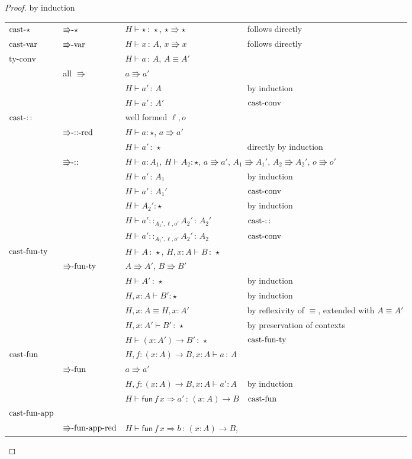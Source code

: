 \begin{proof}
by induction

\begin{tabular}{llll}
$\operatorname{cast-\star}$ & $\textrm{\ensuremath{\Rrightarrow}-}\star$ & $H\vdash\star\,:\,\star$, $\star\Rrightarrow\star$ & follows directly\tabularnewline
$\operatorname{cast-var}$ & $\textrm{\ensuremath{\Rrightarrow}-var}$ & $H\vdash x\,:\,A$, $x\Rrightarrow x$ & follows directly\tabularnewline
$\textrm{ty-conv}$ &  & $H\vdash a\,:\,A$, $A\equiv A'$ & \tabularnewline
 & all $\Rrightarrow$ & $a\Rrightarrow a'$ & \tabularnewline
 &  & $H\vdash a'\,:\,A$ & by induction\tabularnewline
 &  & $H\vdash a'\,:\,A'$ & $\operatorname{cast-conv}$\tabularnewline
$\operatorname{cast-::}$ &  & well formed $\ell,o$ & \tabularnewline
 & $\textrm{\ensuremath{\Rrightarrow}-::-red}$ & $H\vdash a:\star$, $a\Rrightarrow a'$ & \tabularnewline
 &  & $H\vdash a'\,:\,\star$ & directly by induction\tabularnewline
 & $\textrm{\ensuremath{\Rrightarrow}-::}$ & \multicolumn{2}{l}{$H\vdash a:A_{1}$, $H\vdash A_{2}:\star$, $a\Rrightarrow a'$, $A_{1}\Rrightarrow A_{1}'$,
$A_{2}\Rrightarrow A_{2}'$, $o\Rrightarrow o'$}\tabularnewline
 &  & $H\vdash a'\,:\,A_{1}$ & by induction\tabularnewline
 &  & $H\vdash a'\,:\,A_{1}'$ & $\operatorname{cast-conv}$\tabularnewline
 &  & $H\vdash A_{2}':\star$ & by induction\tabularnewline
 &  & $H\vdash a'::_{A_{1}',\ell,o'}A_{2}'\,:\,A_{2}'$ & $\operatorname{cast-::}$\tabularnewline
 &  & $H\vdash a'::_{A_{1}',\ell,o'}A_{2}'\,:\,A_{2}$ & $\operatorname{cast-conv}$\tabularnewline
$\operatorname{cast-fun-ty}$ &  & $H\vdash A\,:\,\star$, $H,x:A\vdash B\,:\,\star$ & \tabularnewline
 & $\textrm{\ensuremath{\Rrightarrow}-fun-ty}$ & $A\Rrightarrow A'$, $B\Rrightarrow B'$ & \tabularnewline
 &  & $H\vdash A'\,:\,\star$ & by induction\tabularnewline
 &  & $H,x:A\vdash B':\star$ & by induction\tabularnewline
 &  & $H,x:A\equiv H,x:A'$ & by reflexivity of $\equiv$, extended with $A\equiv A'$\tabularnewline
 &  & $H,x:A'\vdash B'\,:\,\star$ & by preservation of contexts\tabularnewline
 &  & $H\vdash\left(x:A'\right)\rightarrow B'\,:\,\star$ & $\operatorname{cast-fun-ty}$\tabularnewline
$\operatorname{cast-fun}$ &  & $H,f:\left(x:A\right)\rightarrow B,x:A\vdash a\,:\,A$ & \tabularnewline
 & $\textrm{\ensuremath{\Rrightarrow}-fun}$ & $a\Rrightarrow a'$ & \tabularnewline
 &  & $H,f:\left(x:A\right)\rightarrow B,x:A\vdash a':A$ & by induction\tabularnewline
 &  & $H\vdash\mathsf{fun}\,f\,x\Rightarrow a'\,:\,\left(x:A\right)\rightarrow B$ & $\operatorname{cast-fun}$\tabularnewline
$\operatorname{cast-fun-app}$ &  &  & \tabularnewline
 & $\textrm{\ensuremath{\Rrightarrow}-fun-app-red}$ & \multicolumn{2}{l}{$H\vdash\mathsf{fun}\,f\,x\Rightarrow b\,:\,\left(x:A\right)\rightarrow B$,
}
\end{tabular}
\end{proof}
